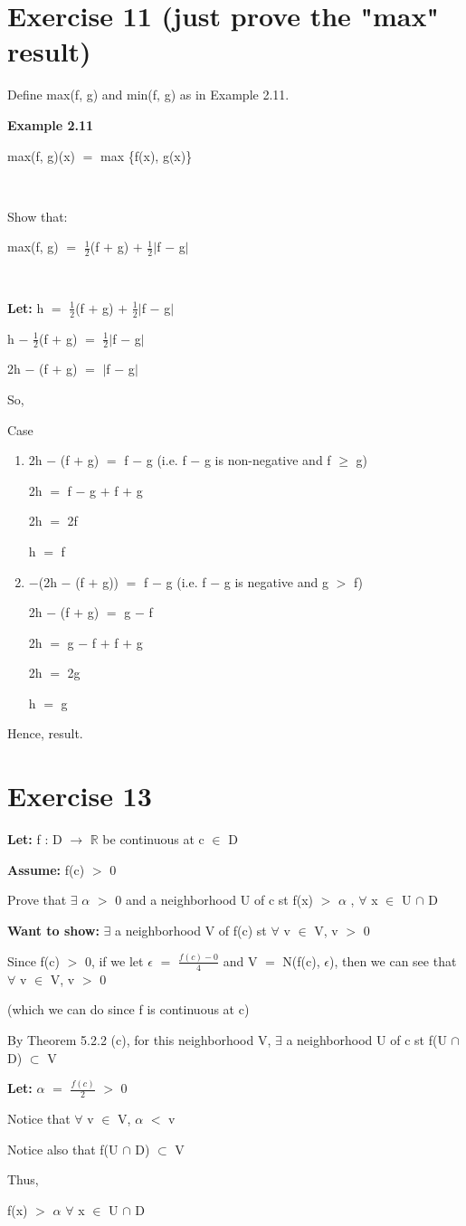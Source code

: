 \documentclass{article}
\newcommand{\mt}[1]{\ensuremath{#1}}
\newcommand\bsc[2][\DefaultOpt]{%
  \def\DefaultOpt{#2}%
  \section[#1]{#2}%
}
\newcommand{\elist}{\end{enumerate}}
\newcommand{\bilist}{\begin{enumerate}[label=\roman*)]}
\newcommand{\lt}[1]{\textbf{Let: } #1}
\newcommand{\wts}[1]{\textbf{Want to show: } #1}
\newcommand{\as}[1]{\textbf{Assume: } #1}
\newcommand{\br}{\mt{\mathbb{R}} }       %
\newcommand{\ep}{\mt{\epsilon} }         %
\newcommand{\fa}{\mt{\forall} }          %
\newcommand{\afa}{\mt{\alpha} }
\newcommand{\mem}{\mt{\in} }
\newcommand{\exs}{\mt{\exists} }
\newcommand{\sbs}{\mt{\subset} }         %
\newcommand{\lra}{ \mt{\longrightarrow} } %
\newcommand{\av}[1]{\mt{|}#1\mt{|}}  %
\newcommand{\bk}[1]{\{#1\}}
\newcommand{\ps}{\mt{+} }
\newcommand{\ms}{\mt{-} }
\newcommand{\ls}{\mt{<} }
\newcommand{\gr}{\mt{>} }
\newcommand{\gre}{\mt{\geq} }
\newcommand{\eql}{\mt{=} }
\newcommand{\frc}[2]{\mt{\frac{#1}{#2}}}
\newcommand{\inn}{\mt{\cap} }
\begin{document}
\newpage

\bsc{Exercise 11 (just prove the "max" result)}{

Define max(f, g) and min(f, g) as in Example 2.11. 

\textbf{Example 2.11}

max(f, g)(x) \eql max \bk{f(x), g(x)}

\

Show that:

max(f, g) \eql \frc{1}{2}(f \ps g) \ps \frc{1}{2}\av{f \ms g}

\

\lt{h \eql \frc{1}{2}(f \ps g) \ps \frc{1}{2}\av{f \ms g}}

h \ms \frc{1}{2}(f \ps g) \eql \frc{1}{2}\av{f \ms g}

2h \ms (f \ps g) \eql \av{f \ms g}

So,

Case
\bilist
\item 2h \ms (f \ps g) \eql f \ms g (i.e. f \ms g is non-negative and f \gre g)

	2h \eql f \ms g \ps f \ps g
	
	2h \eql 2f
	
	h \eql f
\item $-$(2h \ms (f \ps g)) \eql f \ms g (i.e. f \ms g is negative and g \gr f)
	
	2h \ms (f \ps g) \eql g \ms f
	
	2h \eql g \ms f \ps f \ps g
	
	2h \eql 2g
	
	h \eql g
\elist

Hence, result.

}

\bsc{Exercise 13}{

\lt{f : D \lra \br be continuous at c \mem D}

\as{f(c) \gr 0}

Prove that \exs \afa \gr 0 and a neighborhood U of c st f(x) \gr \afa, \fa x \mem U \inn D

\wts{\exs a neighborhood V of f(c) st \fa v \mem V, v \gr 0}

Since f(c) \gr 0, if we let \ep \eql \frc{f(c) \ms 0}{4} and V \eql N(f(c), $\epsilon$), then we can see that \fa v \mem V, v \gr 0

(which we can do since f is continuous at c)

By Theorem 5.2.2 (c), for this neighborhood V, \exs a neighborhood U of c st f(U \inn D) \sbs V

\lt{\afa \eql \frc{f(c)}{2} \gr 0}

Notice that \fa v \mem V, \afa \ls v

Notice also that f(U \inn D) \sbs V

Thus,

f(x) \gr \afa \fa x \mem U \inn D

}
\end{document}
